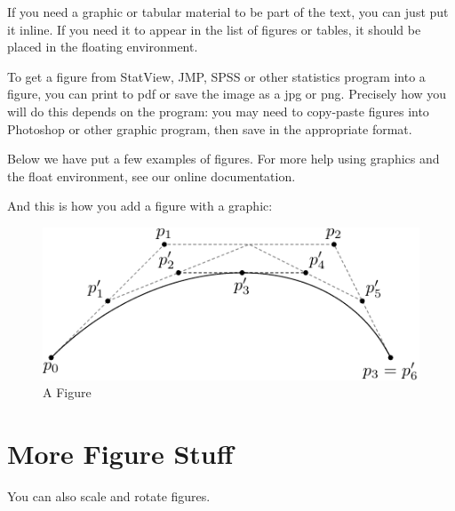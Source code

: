 \documentclass[12pt,twoside]{reedthesis}
\begin{document}
\begin{enumerate}
\begin{enumerate}
	If you need a graphic or tabular material to be part of the text, you can just put it inline. If you need it to appear in the list of figures or tables, it should be placed in the floating environment. 
	
	To get a figure from StatView, JMP, SPSS or other statistics program into a figure, you can print to pdf or save the image as a jpg or png. Precisely how you will do this depends on the program: you may need to copy-paste figures into Photoshop or other graphic program, then save in the appropriate format.
	
	Below we have put a few examples of figures. For more help using graphics and the float environment, see our online documentation.
	
	And this is how you add a figure with a graphic:
	\begin{figure}[h]
	   
	       \centering
	    \includegraphics{subdivision}
	     \caption{A Figure}
	 \label{subd}
	\end{figure}

\clearpage %

\section{More Figure Stuff}
You can also scale and rotate figures.
 	\begin{figure}[h!]
	   

\end{figure}
\end{enumerate}
\end{enumerate}
\end{document}
